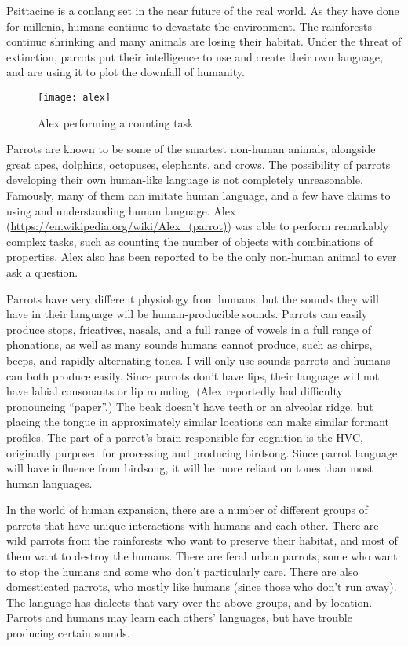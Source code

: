 Psittacine is a conlang set in the near future of the real world.
As they have done for millenia, humans continue to devastate the environment.
The rainforests continue shrinking and many animals are losing their habitat.
Under the threat of extinction,
parrots put their intelligence to use and create their own language,
and are using it to plot the downfall of humanity.

\begin{wrapfigure}{R}{0.46\textwidth}
    \caption{Alex performing a counting task.}
    \centering
    \texttt{[image: alex]}\label{fig:figure}
\end{wrapfigure}

Parrots are known to be some of the smartest non-human animals,
alongside great apes, dolphins, octopuses, elephants, and crows.
The possibility of parrots developing their own human-like language is not completely unreasonable.
Famously, many of them can imitate human language,
and a few
have claims to using and understanding human language.
Alex (\url{https://en.wikipedia.org/wiki/Alex_(parrot)}) was able to
perform remarkably complex tasks,
such as counting the number of objects with combinations of properties.
Alex also has been reported to be the only non-human animal to ever ask a question.

Parrots have very different physiology from humans,
but the sounds they will have in their language will be human-producible sounds.
Parrots can easily produce stops, fricatives, nasals, and a full range of vowels in a full range of phonations,
as well as many sounds humans cannot produce, such as chirps, beeps, and rapidly alternating tones.
I will only use sounds parrots and humans can both produce easily.
Since parrots don't have lips, their language will not have labial consonants or lip rounding.
(Alex reportedly had difficulty pronouncing ``paper''.)
The beak doesn't have teeth or an alveolar ridge,
but placing the tongue in approximately similar locations can make similar formant profiles.
The part of a parrot's brain responsible for cognition is the HVC,
originally purposed for processing and producing birdsong.
Since parrot language will have influence from birdsong,
it will be more reliant on tones than most human languages.

In the world of human expansion,
there are a number of different groups of parrots that
have unique interactions with humans and each other.
There are wild parrots from the rainforests who want to preserve their habitat,
and most of them want to destroy the humans.
There are feral urban parrots,
some who want to stop the humans and some who don't particularly care.
There are also domesticated parrots,
who mostly like humans (since those who don't run away).
The language has dialects that vary over the above groups, and by location.
Parrots and humans may learn each others' languages,
but have trouble producing certain sounds.

